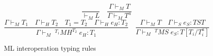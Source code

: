 \begin{figure}
\[
\frac{}{\vdash_{M}L}
\quad
\frac{\Gamma\vdash_{M}T}{\Gamma\vdash_{M}T^{a}}
\]
\bigskip
\[
\frac{\Gamma\vdash_{M}T_{1}\quad\Gamma\vdash_{H}T_{2}\quad T_{1}=T_{2}\quad\Gamma\vdash_{H}e_{H}:T_{2}}{\Gamma\vdash_{M}\;^{T_{1}}MH^{T_{2}}\;e_{H}:T_{1}}
\quad
\frac{\Gamma\vdash_{M}T\quad\Gamma\vdash_{S}e_{S}:TST}{\Gamma\vdash_{M}\;^{T}MS\;e_{S}:T[T_{i}/T^{a}_{i}]}
\]
\caption{ML interoperation typing rules}
\label{mitr}
\end{figure}